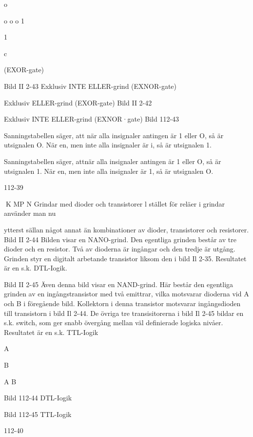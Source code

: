 \documentclass[a4paper,twoside,twocolumn,openright]{book}
\begin{document}
{{{{o

o
o o
1

1

c

(EXOR-gate)

Bild II 2-43 Exklusiv INTE ELLER-grind
(EXNOR-gate)

Exklusiv ELLER-grind (EXOR-gate)
Bild II 2-42

Exklusiv INTE ELLER-grind (EXNOR·gate)
Bild 112-43

Sanningstabellen säger, att när alla insignaler antingen är 1 eller O, så är utsignalen O.
När en, men inte alla insignaler är i, så är
utsignalen 1.

Sanningstabellen säger, attnär alla insignaler
antingen är 1 eller O, så är utsignalen 1. När
en, men inte alla insignaler är 1, så är utsignalen O.

112-39

K MP N
Grindar med dioder och transistorer
l stället för reläer i grindar använder man nu

ytterst sällan något annat än kombinationer
av dioder, transistorer och resistorer.
Bild II 2-44
Bilden visar en NANO-grind. Den egentliga
grinden består av tre dioder och en resistor.
Två av dioderna är ingångar och den tredje
är utgång. Grinden styr en digitalt arbetande
transistor liksom den i bild Il 2-35. Resultatet
är en s.k. DTL-Iogik.

Bild II 2-45
Även denna bild visar en NAND-grind. Här
består den egentliga grinden av en ingångstransistor med två emittrar, vilka motsvarar
dioderna vid A och B i föregående bild.
Kollektorn i denna transistor motsvarar ingångsdioden till transistorn i bild Il 2-44.
De övriga tre transisitorerna i bild Il 2-45
bildar en s.k. switch, som ger snabb övergång mellan väl definierade logiska nivåer.
Resultatet är en s.k. TTL-Iogik

A

B

A
B

Bild 112-44 DTL-Iogik

Bild 112-45 TTL-Iogik

112-40

}}}}
\end{document}
